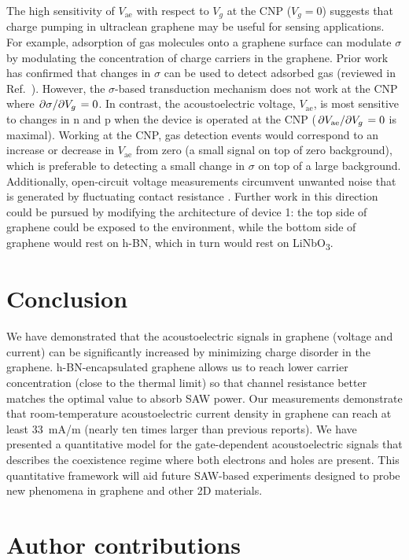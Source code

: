 \documentclass[double,12pt,1in,seploa]{beavtex}
\let\Oldsection\section
\renewcommand{\section}{\FloatBarrier\Oldsection}
\begin{document}
The high sensitivity of $V_{\mathrm{ae}}$ with respect to $V_g$ at the CNP ($V_g = 0$) suggests that charge pumping in ultraclean graphene may be useful for sensing applications. For example, adsorption of gas molecules onto a graphene surface can modulate $\sigma$ by modulating the concentration of charge carriers in the graphene. Prior work has confirmed that changes in $\sigma$ can be used to detect adsorbed gas (reviewed in Ref.\ \cite{yang_gas_2017}). However, the $\sigma$-based transduction mechanism does not work at the CNP where $\pdv*{\sigma}{V_g} = 0$. In contrast, the acoustoelectric voltage, $V_{\mathrm{ae}}$, is most sensitive to changes in n and p when the device is operated at the CNP ($\pdv*{V_{\mathrm{ae}}}{V_g} = 0$ is maximal). Working at the CNP, gas detection events would correspond to an increase or decrease in $V_{\mathrm{ae}}$ from zero (a small signal on top of zero background), which is preferable to detecting a small change in $\sigma$ on top of a large background. Additionally, open-circuit voltage measurements circumvent unwanted noise that is generated by fluctuating contact resistance \cite{schaefer_improved_2020}. Further work in this direction could be pursued by modifying the architecture of device 1: the top side of graphene could be exposed to the environment, while the bottom side of graphene would rest on h-BN, which in turn would rest on LiNbO\textsubscript{3}.


\section{Conclusion}
We have demonstrated that the acoustoelectric signals in graphene (voltage and current) can be significantly increased by minimizing charge disorder in the graphene. h-BN-encapsulated graphene allows us to reach lower carrier concentration (close to the thermal limit) so that channel resistance better matches the optimal value to absorb SAW power. Our measurements demonstrate that room-temperature acoustoelectric current density in graphene can reach at least \SI{33}{\milli\ampere/\meter} (nearly ten times larger than previous reports). We have presented a quantitative model for the gate-dependent acoustoelectric signals that describes the coexistence regime where both electrons and holes are present. This quantitative framework will aid future SAW-based experiments designed to probe new phenomena in graphene and other 2D materials.


\section{Author contributions}
\end{document}
